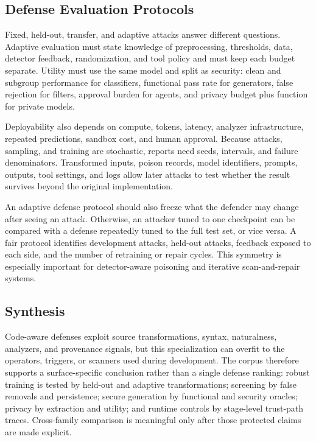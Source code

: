 \documentclass[acmsmall,screen,review]{acmart}
\begin{document}
\subsection{Defense Evaluation Protocols}
Fixed, held-out, transfer, and adaptive attacks answer different questions. Adaptive evaluation must state knowledge of preprocessing, thresholds, data, detector feedback, randomization, and tool policy and must keep each budget separate. Utility must use the same model and split as security: clean and subgroup performance for classifiers, functional pass rate for generators, false rejection for filters, approval burden for agents, and privacy budget plus function for private models.

Deployability also depends on compute, tokens, latency, analyzer infrastructure, repeated predictions, sandbox cost, and human approval. Because attacks, sampling, and training are stochastic, reports need seeds, intervals, and failure denominators. Transformed inputs, poison records, model identifiers, prompts, outputs, tool settings, and logs allow later attacks to test whether the result survives beyond the original implementation.

An adaptive defense protocol should also freeze what the defender may change after seeing an attack. Otherwise, an attacker tuned to one checkpoint can be compared with a defense repeatedly tuned to the full test set, or vice versa. A fair protocol identifies development attacks, held-out attacks, feedback exposed to each side, and the number of retraining or repair cycles. This symmetry is especially important for detector-aware poisoning and iterative scan-and-repair systems.

\subsection{Synthesis} \label{sec:defense:discussion}
Code-aware defenses exploit source transformations, syntax, naturalness, analyzers, and provenance signals, but this specialization can overfit to the operators, triggers, or scanners used during development. The corpus therefore supports a surface-specific conclusion rather than a single defense ranking: robust training is tested by held-out and adaptive transformations; screening by false removals and persistence; secure generation by functional and security oracles; privacy by extraction and utility; and runtime controls by stage-level trust-path traces. Cross-family comparison is meaningful only after those protected claims are made explicit.
\end{document}
